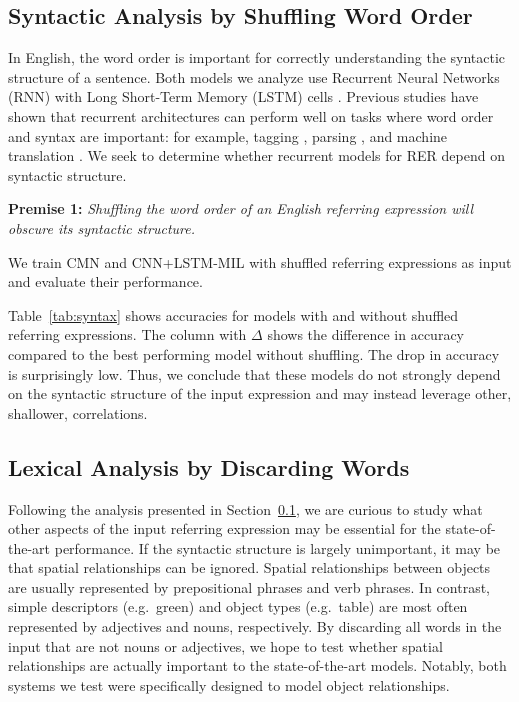 \documentclass[11pt,a4paper]{article}
\begin{document}
\subsection{Syntactic Analysis by Shuffling Word Order}\label{ssec:syntax}%
In English, the word order is important for correctly understanding the syntactic structure of a sentence.
Both models we analyze use Recurrent Neural Networks (RNN) \cite{elman1990finding} with Long Short-Term Memory (LSTM) cells \cite{hochreiter1997long}.
Previous studies have shown that recurrent architectures can perform well on tasks where word order and syntax are important: for example, tagging \cite{lample2016neural}, parsing \cite{sutskever2014sequence}, and machine translation \cite{bahdanau2014neural}. We seek to determine whether recurrent models for RER depend on syntactic structure.

\noindent\textbf{Premise 1:} \textit{Shuffling the word order of an English referring expression will obscure its syntactic structure.}

\noindent We train CMN and CNN+LSTM-MIL with shuffled referring expressions as input and evaluate their performance.

\tablefive
Table~\ref{tab:syntax} shows accuracies for models with and without shuffled referring expressions.
The column with $\Delta$ shows the difference in accuracy compared to the best performing model without shuffling. 
The drop in accuracy is surprisingly low. 
Thus, we conclude that these models do not strongly depend on the syntactic structure of the input expression and may instead leverage other, shallower, correlations.

\subsection{Lexical Analysis by Discarding Words}\label{ssec:lexical}%
Following the analysis presented in Section~\ref{ssec:syntax}, we are curious to study what other aspects of the input referring expression may be essential for the state-of-the-art performance.
If the syntactic structure is largely unimportant, it may be that spatial relationships can be ignored.
Spatial relationships between objects are usually represented by prepositional phrases and verb phrases.
In contrast, simple descriptors (e.g.~green) and object types (e.g.~table) are most often represented by adjectives and nouns, respectively. By discarding all words in the input that are not nouns or adjectives, we hope to test whether spatial relationships are actually important to the state-of-the-art models.
Notably, both systems we test were specifically designed to model object relationships.
\end{document}
